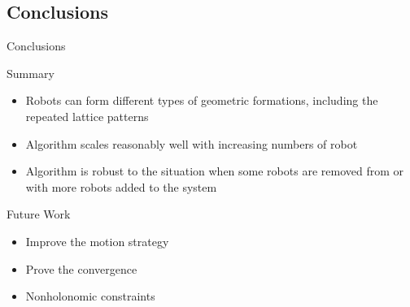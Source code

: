 \documentclass[10pt]{beamer}
\begin{document}
\subsection{Conclusions}
\begin{frame}{Conclusions}{}
\begin{block}{Summary}
  \begin{itemize}
  \item Robots can form different types of geometric formations,
    including the repeated lattice patterns
  \item Algorithm scales reasonably well with increasing numbers of
    robot
  \item Algorithm is robust to the situation when some robots are removed from or
    with more robots added to the system
  \end{itemize}
\end{block}
\begin{block}{Future Work}
  \begin{itemize}
  \item Improve the motion strategy
  \item Prove the convergence
  \item Nonholonomic constraints
  \end{itemize}
\end{block}
\end{frame}
\end{document}
